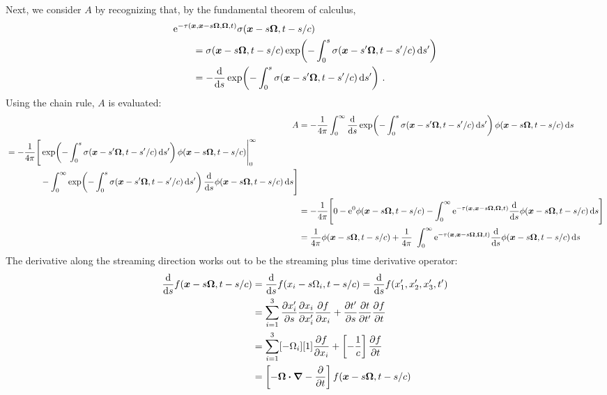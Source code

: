 Next, we consider $A$ by recognizing that, by the fundamental theorem of
calculus,
\begin{align*}
  \lefteqn{\eexp^{ -\tau(\vec{x}, \vec{x} - s \vec{\Omega}, \vec{\Omega}, t)}
  \sigma(\vec{x} - s \vec{\Omega}, t-s/c)}\qquad&
  \\
  &= \sigma(\vec{x} - s \vec{\Omega}, t-s/c) \expp{ -\int_{0}^{s}
  \sigma(\vec{x}-s'\vec{\Omega}, t-s'/c) \ud s'}
  \\
  &= -\oder{}{s}
    \expp{ -\int_{0}^{s} \sigma(\vec{x}-s'\vec{\Omega}, t-s'/c) \ud s'}\,.
\end{align*}
Using the chain rule, $A$ is evaluated:
\begin{align*}
  A &= 
  -\frac{1}{4\pi}\int_{0}^{\infty}
  \oder{}{s}
    \expp{- \int_{0}^{s} \sigma(\vec{x}-s'\vec{\Omega}, t-s'/c) \ud s'}
  \phi(\vec{x} - s \vec{\Omega}, t-s/c)
  \ud s
  \\
    \begin{split}
  &=-\frac{1}{4\pi} \Bigg[ 
\expp{- \int_{0}^{s} \sigma(\vec{x}-s'\vec{\Omega}, t-s'/c) \ud s'} 
\phi(\vec{x} - s \vec{\Omega}, t-s/c) \Bigg|_{0}^{\infty}
\\
&\qquad\qquad- \int_{0}^{\infty} \expp{- \int_{0}^{s} \sigma(\vec{x}-s'\vec{\Omega}, t-s'/c) \ud s'}
\oder{}{s} \phi(\vec{x} - s \vec{\Omega}, t-s/c)
\ud s
  \Bigg]
    \end{split}
  \\
  &=-\frac{1}{4\pi} \Bigg[ 
0 -  
\eexp^0 \phi(\vec{x} - s \vec{\Omega}, t-s/c)
- \int_{0}^{\infty} \eexp^{-\tau(\vec{x}, \vec{x} - s \vec{\Omega}, \vec{\Omega}, t)}
\oder{}{s} \phi(\vec{x} - s \vec{\Omega}, t-s/c)
\ud s
  \Bigg]
  \\
 &=\frac{1}{4\pi}\phi(\vec{x} - s \vec{\Omega}, t-s/c)
+ \frac{1}{4\pi}\ \int_{0}^{\infty} \eexp^{-\tau(\vec{x}, \vec{x} - s \vec{\Omega}, \vec{\Omega}, t)}
\oder{}{s} \phi(\vec{x} - s \vec{\Omega}, t-s/c)
\ud s
\end{align*}
The derivative along the streaming direction works out to be the streaming plus
time derivative operator:
\begin{align*}
  \frac{\mathrm{d} }{\mathrm{d} s} f(\bm{x} - s \bm{\Omega}, t-s/c)
  &=  \frac{\mathrm{d} }{\mathrm{d} s} f(x_i - s \Omega_i, t-s/c)
  = \frac{\mathrm{d} }{\mathrm{d} s} f(x_1',x_2',x_3',t')
  \\
  &= \sum_{i=1}^{3}
  \frac{\partial x_i'}{\partial s}\frac{\partial x_i}{\partial x_i'} \frac{\partial f}{\partial x_i}
  + \frac{\partial t'}{\partial s}\frac{\partial t}{\partial t'} \frac{\partial f}{\partial t}
  \\
  &= \sum_{i=1}^{3} [- \Omega_i][1]\frac{\partial f}{\partial x_i} 
  + \left[ -\frac{1}{c} \right]  \frac{\partial f}{\partial t}
  \\
  &= \left[ -\bm{\Omega} \bm{\cdot} \bm{\nabla} - \frac{\partial }{\partial t} \right]
    f(\bm{x} - s \bm{\Omega}, t-s/c)
\end{align*}
